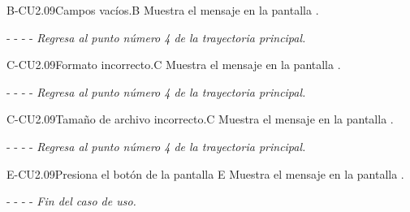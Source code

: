 	\begin{UCtrayectoriaA}{B-CU2.09}{Campos vacíos.}{B}
	    \UCpaso[\UCsist]Muestra el mensaje en la pantalla .
	    \item[- -] - - {\em Regresa al punto número 4 de la trayectoria principal.}
	\end{UCtrayectoriaA}

	
	\begin{UCtrayectoriaA}{C-CU2.09}{Formato incorrecto.}{C}
	    \UCpaso[\UCsist]Muestra el mensaje  en la pantalla .
	    \item[- -] - - {\em Regresa al punto número 4 de la trayectoria principal.}
	\end{UCtrayectoriaA}

	\begin{UCtrayectoriaA}{C-CU2.09}{Tamaño de archivo incorrecto.}{C}
	    \UCpaso[\UCsist]Muestra el mensaje  en la pantalla .
	    \item[- -] - - {\em Regresa al punto número 4 de la trayectoria principal.}
	\end{UCtrayectoriaA}
	
    
	\begin{UCtrayectoriaA}{E-CU2.09}{Presiona el botón  de la pantalla }{E}
		\UCpaso[\UCsist] Muestra el mensaje  en la pantalla .
		\item[- -] - - {\em Fin del caso de uso.} 
	\end{UCtrayectoriaA}


 